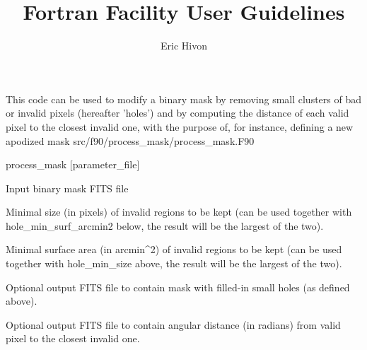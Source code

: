 
\sloppy


\title{\healpix Fortran Facility User Guidelines}
 \section[process\_mask]{\nosectionname}
\label{fac:process_mask}
\author{Eric Hivon}

\begin{facility}
{This code can be used to modify a binary mask by removing small clusters of bad
or invalid pixels (hereafter 'holes') and by computing the distance of each
valid pixel to the closest invalid one, with the purpose of, for instance,
defining a new apodized mask} 
{src/f90/process\_mask/process\_mask.F90}
\end{facility}

\begin{f90facility}
{process\_mask [parameter\_file]}
\end{f90facility}


\begin{qualifiers}
  \begin{qulist}{} %
\item[{mask\_file = }]%
 Input binary mask FITS file
\item[{hole\_min\_size = }]%
 Minimal size (in pixels) of invalid regions to be kept
       (can be used together with hole\_min\_surf\_arcmin2 below, the result will
be the largest of the two). 
\item[{hole\_min\_surf\_arcmin2 = }] Minimal surface area (in arcmin\^{}2) of invalid regions to be kept
       (can be used together with hole\_min\_size above,
        the result will be the largest of the two). 
\item[{filled\_file = }] Optional output FITS file to contain mask with
filled-in small holes (as defined above). 
\item[{distance\_file = }]%
 Optional output FITS file to contain angular distance
(in radians) from valid pixel to the closest invalid one. 

  \end{qulist}
\end{qualifiers}

